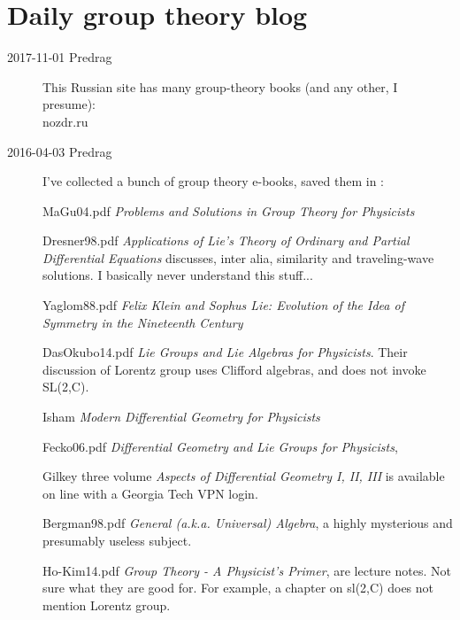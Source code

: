 

\chapter{Daily group theory blog}
\label{s-groupTheBlog}



\begin{description}

\item[2017-11-01 Predrag]
This Russian site has many group-theory books (and any other, I presume):\\
 {nozdr.ru}

\item[2016-04-03 Predrag] I've collected a bunch of group theory e-books,
saved them in :

MaGu04.pdf
{\em Problems and Solutions in Group Theory for Physicists}

Dresner98.pdf
{\em Applications of Lie's Theory of Ordinary and Partial Differential Equations}
discusses, inter alia, similarity and traveling-wave solutions.
I basically never understand this stuff...

Yaglom88.pdf {\em Felix Klein and Sophus Lie: Evolution of the
Idea of Symmetry in the Nineteenth Century}

DasOkubo14.pdf
{\em Lie Groups and Lie Algebras for Physicists}.
Their discussion of Lorentz group uses
Clifford algebras, and does not invoke SL(2,C).

Isham
{\em Modern Differential Geometry for Physicists}

Fecko06.pdf
{\em Differential Geometry and Lie Groups for Physicists},

Gilkey \etal{} three volume
{\em Aspects of Differential Geometry I, II, III} is available on line
with a Georgia Tech VPN login.

Bergman98.pdf
{\em General (a.k.a. Universal) Algebra},
a highly mysterious and presumably useless subject.

{Ho-Kim14.pdf} {\em  Group Theory - A Physicist's Primer}, are lecture
notes. Not sure what they are good for. For example, a chapter on sl(2,C)
does not mention Lorentz group.


\end{description}
